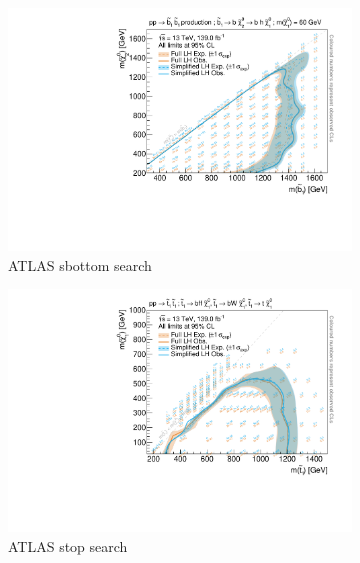 \begin{figure}
	\centering
	\begin{subfigure}[b]{0.5\textwidth}
		\centering\includegraphics[width=\textwidth]{exclusion_sbottom_CLs_noLabel_v2}
		\caption{ATLAS sbottom search~\cite{SUSY-2018-31}\label{fig:results_sbottom_CLs}}
	\end{subfigure}\hfill
	\begin{subfigure}[b]{0.5\textwidth}
		\centering\includegraphics[width=\textwidth]{exclusion_stop1L_CLs_noLabel_v2}
		\caption{ATLAS stop search\label{fig:results_stop1L_CLs}}
	\end{subfigure}\hfill
	\par\medskip
	\par\medskip
	\begin{subfigure}[b]{0.5\textwidth}

\end{subfigure}
\end{figure}
